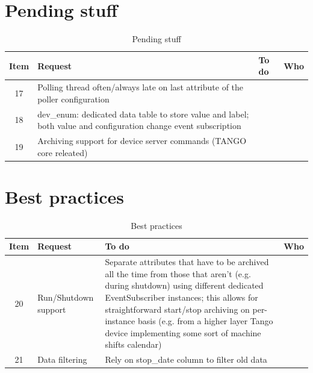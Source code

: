 \documentclass[11pt,a4paper]{article}
\begin{document}
\newpage

\section{Pending stuff}

\begin{table}[htb]
	\center
	\begin{tabular}{|c|p{6.1cm}|p{6.1cm}|p{1.1cm}|}
		\hline
		\bf{Item} & \bf{Request} & \bf{To do} & \bf{Who} \\
		\hline
		17 &
		Polling thread often/always late on last attribute of the poller
		configuration &
		&
		\\
		\hline
		18 &
		dev\_enum: dedicated data table to store value and label; both value
		and configuration change event subscription &
		&
		\\
		\hline
		19 &
		Archiving support for device server commands (TANGO core releated) &
		&
		\\
		\hline
	\end{tabular}
	\caption{Pending stuff}
	\label{tab:pending}
\end{table}

\section{Best practices}

\begin{table}[htb]
	\center
	\begin{tabular}{|c|p{6.1cm}|p{6.1cm}|p{1.1cm}|}
		\hline
		\bf{Item} & \bf{Request} & \bf{To do} & \bf{Who} \\
		\hline
		20 &
		Run/Shutdown support &
		Separate attributes that have to be archived all the time from
		those that aren't (e.g. during shutdown) using different dedicated 
		EventSubscriber instances; this allows for straightforward
		start/stop archiving on per-instance basis (e.g. from a higher layer
		Tango device implementing some sort of machine shifts calendar) &
		\\
		\hline
		21 &
		Data filtering &
		Rely on stop\_date column to filter old data &
		\\
		\hline
	\end{tabular}
	\caption{Best practices}
	\label{tab:best-practice}
\end{table}
\end{document}
